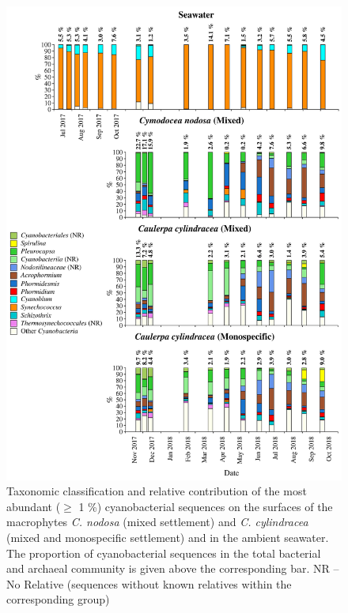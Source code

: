 \documentclass[12pt,]{article}
\begin{document}
\begin{figure}[H]

{\centering \includegraphics[width=0.85\linewidth]{../results/figures/cyanobacteria_bar_plot} 

}

\caption{Taxonomic classification and relative contribution of the most abundant ($\geq$ 1 \si{\percent}) cyanobacterial sequences on the surfaces of the macrophytes \textit{C. nodosa} (mixed settlement) and \textit{C. cylindracea} (mixed and monospecific settlement) and in the ambient seawater. The proportion of cyanobacterial sequences in the total bacterial and archaeal community is given above the corresponding bar. NR -- No Relative (sequences without known relatives within the corresponding group)\label{cyano}}\label{fig:unnamed-chunk-5}
\end{figure}
\end{document}
